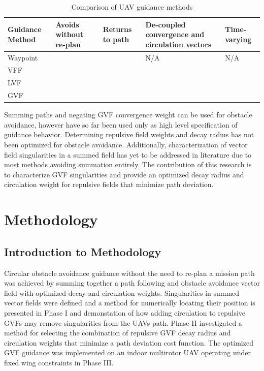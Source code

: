 \documentclass[numbered,pdftex]{ohio-etd}
\begin{document}
\setlength{\tabcolsep}{10pt} %
\renewcommand{\arraystretch}{0.5} %
\begin{table}[]
	\caption{Comparison of UAV guidance methods}
	\label{table:compareMeth}
	\begin{tabular}{|C{2.5cm}|C{2.5cm}|C{2.5cm}|C{2.5cm}|C{2.5cm}|}	
		\hline
		Guidance Method & Avoids without re-plan    & Returns to path   & De-coupled convergence and circulation vectors       & Time-varying              \\ \hline
		Waypoint        &                           & \Checkmark & N/A                       & N/A                       \\ \hline
		VFF             & \Checkmark &                           &                           &                           \\ \hline
		LVF             & \Checkmark & \Checkmark &                           &                           \\ \hline
		GVF             & \Checkmark & \Checkmark & \Checkmark & \Checkmark \\ \hline
	\end{tabular}
\end{table}


 Summing paths and negating GVF convergence weight can be used for obstacle avoidance, however have so far been used only as high level specification of guidance behavior. Determining repulsive field weights and decay radius has not been optimized for obstacle avoidance. Additionally, characterization of vector field singularities in a summed field has yet to be addressed in literature due to most methods avoiding summation entirely. The contribution of this research is to characterize GVF singularities and provide an optimized decay radius and circulation weight for repulsive fields that minimize path deviation. 

\chapter{Methodology}


\section{Introduction to Methodology}
Circular obstacle avoidance guidance without the need to re-plan a mission path was achieved by summing together a path following and obstacle avoidance vector field with optimized decay and circulation weights. Singularities in summed vector fields were defined and a method for numerically locating their position is presented in Phase I and demonstation of how adding circulation to repulsive GVFs may remove singularities from the UAVs path. Phase II investigated a method for selecting the combination of repulsive GVF decay radius and circulation weights that minimize a path deviation cost function. The optimized GVF guidance was implemented on an indoor multirotor UAV operating under fixed wing constraints in Phase III.
\end{document}

